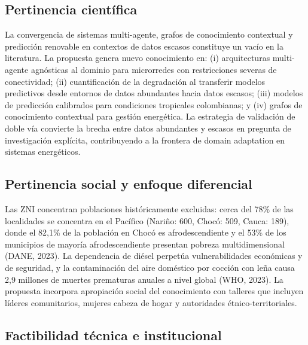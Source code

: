 \documentclass[12pt,letterpaper]{article}
\begin{document}
\subsection*{Pertinencia cient\'ifica}

La convergencia de sistemas multi-agente, grafos de conocimiento contextual y predicci\'on renovable en contextos de datos escasos constituye un vac\'io en la literatura. La propuesta genera nuevo conocimiento en: (i) arquitecturas multi-agente agn\'osticas al dominio para microrredes con restricciones severas de conectividad; (ii) cuantificaci\'on de la degradaci\'on al transferir modelos predictivos desde entornos de datos abundantes hacia datos escasos; (iii) modelos de predicci\'on calibrados para condiciones tropicales colombianas; y (iv) grafos de conocimiento contextual para gesti\'on energ\'etica. La estrategia de validaci\'on de doble v\'ia convierte la brecha entre datos abundantes y escasos en pregunta de investigaci\'on expl\'icita, contribuyendo a la frontera de domain adaptation en sistemas energ\'eticos.

\subsection*{Pertinencia social y enfoque diferencial}

Las ZNI concentran poblaciones hist\'oricamente excluidas: cerca del 78\% de las localidades se concentra en el Pac\'ifico (Nari\~no: 600, Choc\'o: 509, Cauca: 189), donde el 82,1\% de la poblaci\'on en Choc\'o es afrodescendiente y el 53\% de los municipios de mayor\'ia afrodescendiente presentan pobreza multidimensional (DANE, 2023). La dependencia de di\'esel perpet\'ua vulnerabilidades econ\'omicas y de seguridad, y la contaminaci\'on del aire dom\'estico por cocci\'on con le\~na causa 2,9 millones de muertes prematuras anuales a nivel global (WHO, 2023). La propuesta incorpora apropiaci\'on social del conocimiento con talleres que incluyen l\'ideres comunitarios, mujeres cabeza de hogar y autoridades \'etnico-territoriales.

\subsection*{Factibilidad t\'ecnica e institucional}
\end{document}
